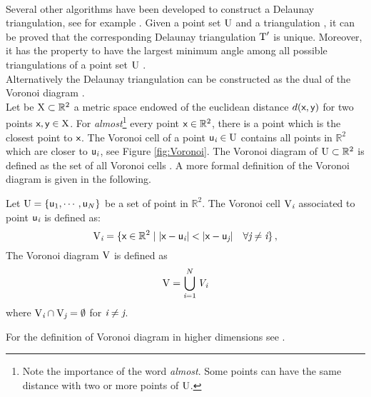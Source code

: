 \\ \indent Several other algorithms have been developed to construct a Delaunay triangulation, see for example \cite{lee1980two, renka1997algorithm}.
 Given a point set $\mbox{$\textup{U}$}$ and a triangulation , it can be proved that the corresponding Delaunay triangulation $\mbox{$\textup{T}$}^\prime$ is unique. Moreover, it has the property to have the largest minimum angle among all possible triangulations of a point set $\mbox{$\textup{U}$}$ \cite{press2007numerical}.
\\ \indent Alternatively the Delaunay triangulation can be constructed as the dual of the Voronoi diagram \cite{fortune1992voronoi}.\\\indent Let be $\mbox{$\textup{X}$}\subset\mathbb{R}^2$ a metric space endowed of the euclidean distance $d(\textsf{x}, \textsf{y})$ for two points $\textsf{x}, \textsf{y}\in \mbox{$\textup{X}$}$. For \textit{almost}\footnote{Note the importance of the word \textit{almost}. Some points can have the same distance with two or more points of $\mbox{$\textup{U}$}$.} every point $\textsf{x}\in \mathbb{R}^2$, there is a point which is the closest point to $\textsf{x}$. The Voronoi cell of a point $\textsf{u}_{\textit{i}}\in \mbox{$\textup{U}$}$ contains all points in $\mathbb{R}^2$ which are closer to $\textsf{u}_{\textit{i}}$, see Figure \ref{fig:Voronoi}. The Voronoi diagram of $\mbox{$\textup{U}$}\subset \mathbb{R}^2$ is defined as the set of all Voronoi cells \cite{cazals2005conformal}. A more formal definition of the Voronoi diagram is given in the following.
\begin{defn}
Let $\mbox{$\textup{U}$}=\{\textsf{u}_1,\cdots,\textsf{u}_N\}$ be a set of point in $\mathbb{R}^2$. The Voronoi cell $\mbox{$\textup{V}$}_{\textit{i}}$ associated to point $\textsf{u}_{\textit{i}}$ is defined as:
\begin{equation}
\mbox{\insieme{V}}_\variabile{i}=\{\point{x}\in \mathbb{R}^2\; | \;|\point{x}-\point{u}_\variabile{i}|<|\point{x}-\point{u}_\variabile{j}| \quad \forall \variabile{j}\neq \variabile{i} \}\,,
\end{equation}
The Voronoi diagram $\mbox{$\textup{V}$}$ is defined as 
\begin{equation}
\mbox{$\textup{V}$} = \bigcup_{\textit{i}=1}^N \emph{V}_{\textit{i}}
\end{equation}
 where $\mbox{$\textup{V}$}_{\textit{i}}\cap \mbox{$\textup{V}$}_{\textit{j}}= \emptyset$ for $\textit{i}\neq\textit{j}$.
\end{defn}
For the definition of Voronoi diagram in higher dimensions see \cite{brown1979voronoi}.
